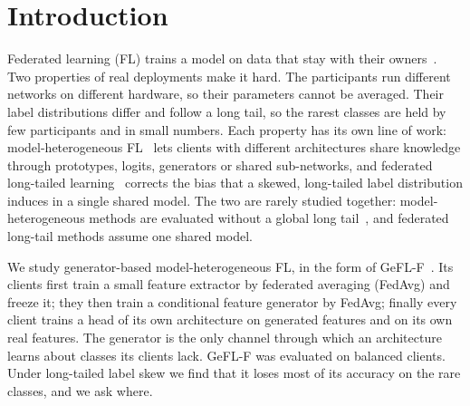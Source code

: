 \section{Introduction}\label{sec:intro}

Federated learning (FL) trains a model on data that stay with their owners~\cite{mcmahan2017fedavg,kairouz2021advances}.
Two properties of real deployments make it hard. The participants run different networks on different hardware, so
their parameters cannot be averaged. Their label distributions differ and follow a long tail, so the rarest classes
are held by few participants and in small numbers. Each property has its own line of work: model-heterogeneous
FL~\cite{tan2022fedproto,zhang2024fedtgp,zhu2021fedgen,yi2023fedgh,yi2024fedmrl,kang2025gefl} lets clients with
different architectures share knowledge through prototypes, logits, generators or shared sub-networks, and
federated long-tailed learning~\cite{shang2022creff,xiao2023fedgrab,xiao2024fedloge,yan2025fedyoyo,huang2024rucr}
corrects the bias that a skewed, long-tailed label distribution induces in a single shared model. The two are rarely
studied together: model-heterogeneous methods are evaluated without a global long tail~\cite{zhang2025htfllib}, and
federated long-tail methods assume one shared model.

We study generator-based model-heterogeneous FL, in the form of GeFL-F~\cite{kang2025gefl}. Its clients first train a
small feature extractor by federated averaging (FedAvg) and freeze it; they then train a conditional feature generator
by FedAvg; finally every client trains a head of its own architecture on generated features and on its own real
features. The generator is the only channel through which an architecture learns about classes its clients lack.
GeFL-F was evaluated on balanced clients. Under long-tailed label skew we find that it loses most of its accuracy on
the rare classes, and we ask where.

